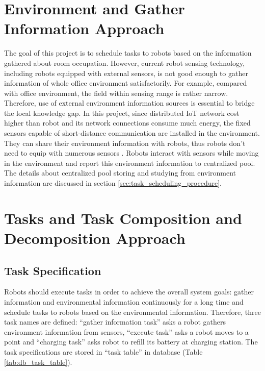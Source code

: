 \section{Environment and Gather Information Approach}
\label{sec:environment_and_gather_information_approach}

The goal of this project is to schedule tasks to robots based on the information gathered about room occupation. However, current robot sensing technology, including robots equipped with external sensors, is not good enough to gather information of whole office environment satisfactorily. 
For example, compared with office environment, the field within sensing range is rather narrow. Therefore, use of external environment information sources is essential to bridge the local knowledge gap.
In this project, since distributed IoT network cost higher than robot and its network connections consume much energy, the fixed sensors capable of short-distance communication are installed in the environment. They can share their environment information with robots, thus robots don't need to equip with numerous sensors \cite{PYO2015148}.
Robots interact with sensors while moving in the environment and report this environment information to centralized pool.
The details about centralized pool storing and studying from environment information are discussed in section \ref{sec:task_scheduling_procedure}.



\section{Tasks and Task Composition and Decomposition Approach}
\label{sec:task_explan}

\subsection{Task Specification}
Robots should execute tasks in order to achieve the overall system goals: gather information and environmental information continuously for a long time and schedule tasks to robots based on the environmental information. Therefore, three task names are defined: ``gather information task'' asks a robot gathers environment information from sensors, ``execute task'' asks a robot moves to a point and  ``charging task'' asks robot to refill its battery at charging station.
The task specifications are stored in ``task table'' in database (Table \ref{tab:db_task_table}).

